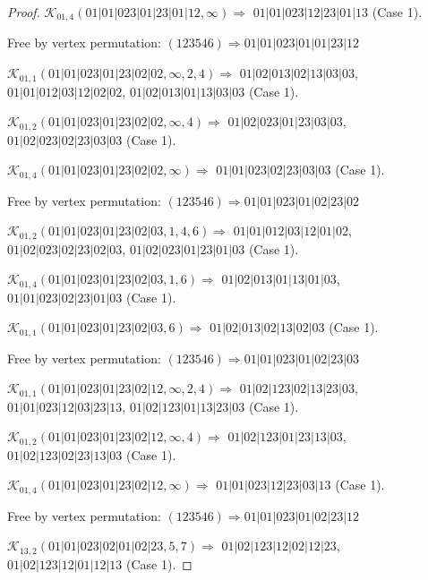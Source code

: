 \documentclass[12pt]{article}
\theoremstyle{plain}
\theoremstyle{definition}
\theoremstyle{remark}
\newcommand{\fancy}[1]{\mathcal{#1}}
\def\K{\fancy{K}}
\begin{document}
\begin{proof}
	$\K_{01,4}(01|01|023|01|23|01|12,\infty)\Rightarrow $ $01|01|023|12|23|01|13$ (Case 1).
	
	
	
	Free by vertex permutation: $(1 2 3 5 4 6)\Rightarrow 01|01|023|01|01|23|12$
	
	
	
	\bigskip
	
	$\K_{01,1}(01|01|023|01|23|02|02,\infty,2, 4)\Rightarrow $ $01|02|013|02|13|03|03$, $01|01|012|03|12|02|02$, $01|02|013|01|13|03|03$ (Case 1).
	
	$\K_{01,2}(01|01|023|01|23|02|02,\infty,4)\Rightarrow $ $01|02|023|01|23|03|03$, $01|02|023|02|23|03|03$ (Case 1).
	
	$\K_{01,4}(01|01|023|01|23|02|02,\infty)\Rightarrow $ $01|01|023|02|23|03|03$ (Case 1).
	
	
	
	Free by vertex permutation: $(1 2 3 5 4 6)\Rightarrow 01|01|023|01|02|23|02$
	
	
	
	\bigskip
	
	$\K_{01,2}(01|01|023|01|23|02|03,1, 4, 6)\Rightarrow $ $01|01|012|03|12|01|02$, $01|02|023|02|23|02|03$, $01|02|023|01|23|01|03$ (Case 1).
	
	$\K_{01,4}(01|01|023|01|23|02|03,1, 6)\Rightarrow $ $01|02|013|01|13|01|03$, $01|01|023|02|23|01|03$ (Case 1).
	
	$\K_{01,1}(01|01|023|01|23|02|03,6)\Rightarrow $ $01|02|013|02|13|02|03$ (Case 1).
	
	
	
	Free by vertex permutation: $(1 2 3 5 4 6)\Rightarrow 01|01|023|01|02|23|03$
	
	
	
	\bigskip
	
	$\K_{01,1}(01|01|023|01|23|02|12,\infty,2, 4)\Rightarrow $ $01|02|123|02|13|23|03$, $01|01|023|12|03|23|13$, $01|02|123|01|13|23|03$ (Case 1).
	
	$\K_{01,2}(01|01|023|01|23|02|12,\infty,4)\Rightarrow $ $01|02|123|01|23|13|03$, $01|02|123|02|23|13|03$ (Case 1).
	
	$\K_{01,4}(01|01|023|01|23|02|12,\infty)\Rightarrow $ $01|01|023|12|23|03|13$ (Case 1).
	
	
	
	Free by vertex permutation: $(1 2 3 5 4 6)\Rightarrow 01|01|023|01|02|23|12$
	
	
	
	\bigskip
	
	$\K_{13,2}(01|01|023|02|01|02|23,5, 7)\Rightarrow $ $01|02|123|12|02|12|23$, $01|02|123|12|01|12|13$ (Case 1).
	

\end{proof}
\end{document}

